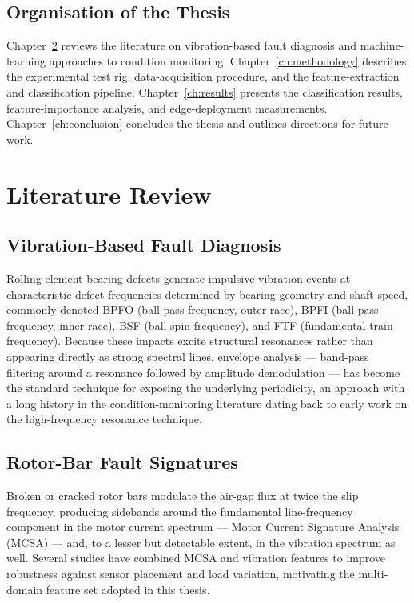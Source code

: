 \documentclass[12pt,a4paper]{report}
\begin{document}
\section{Organisation of the Thesis}
Chapter~\ref{ch:litreview} reviews the literature on vibration-based fault diagnosis and
machine-learning approaches to condition monitoring. Chapter~\ref{ch:methodology} describes the
experimental test rig, data-acquisition procedure, and the feature-extraction and classification
pipeline. Chapter~\ref{ch:results} presents the classification results, feature-importance
analysis, and edge-deployment measurements. Chapter~\ref{ch:conclusion} concludes the thesis and
outlines directions for future work.

\chapter{Literature Review}
\label{ch:litreview}

\section{Vibration-Based Fault Diagnosis}
Rolling-element bearing defects generate impulsive vibration events at characteristic defect
frequencies determined by bearing geometry and shaft speed, commonly denoted BPFO (ball-pass
frequency, outer race), BPFI (ball-pass frequency, inner race), BSF (ball spin frequency), and
FTF (fundamental train frequency). Because these impacts excite structural resonances rather than
appearing directly as strong spectral lines, envelope analysis --- band-pass filtering around a
resonance followed by amplitude demodulation --- has become the standard technique for exposing
the underlying periodicity, an approach with a long history in the condition-monitoring
literature dating back to early work on the high-frequency resonance technique.

\section{Rotor-Bar Fault Signatures}
Broken or cracked rotor bars modulate the air-gap flux at twice the slip frequency, producing
sidebands around the fundamental line-frequency component in the motor current spectrum ---
Motor Current Signature Analysis (MCSA) --- and, to a lesser but detectable extent, in the
vibration spectrum as well. Several studies have combined MCSA and vibration features to improve
robustness against sensor placement and load variation, motivating the multi-domain feature set
adopted in this thesis.
\end{document}
